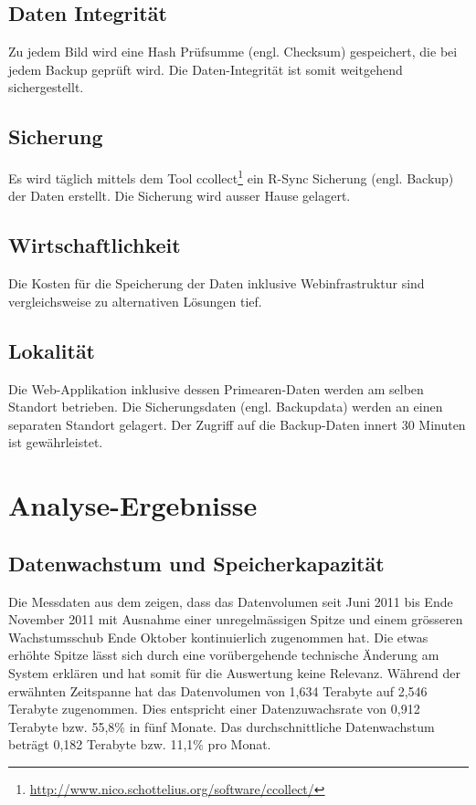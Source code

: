 \subsection{Daten Integrität}
Zu jedem Bild wird eine Hash Prüfsumme (engl. Checksum) gespeichert, die bei jedem Backup geprüft wird. Die Daten-Integrität ist somit weitgehend sichergestellt.

\subsection{Sicherung}
Es wird täglich mittels dem Tool ccollect\footnote{\url{http://www.nico.schottelius.org/software/ccollect/}} ein R-Sync Sicherung (engl. Backup) der Daten erstellt. Die Sicherung wird ausser Hause gelagert.

\subsection{Wirtschaftlichkeit}
Die Kosten für die Speicherung der Daten inklusive Webinfrastruktur sind vergleichsweise zu alternativen Lösungen tief.

\subsection{Lokalität}

Die Web-Applikation inklusive dessen \gls{Primearen-Daten} werden am selben Standort betrieben. Die Sicherungsdaten (engl. Backupdata) werden an einen separaten Standort gelagert. Der Zugriff auf die Backup-Daten innert 30 Minuten ist gewährleistet.

\section{Analyse-Ergebnisse}

\subsection{Datenwachstum und Speicherkapazität}
Die Messdaten aus dem  zeigen, dass das Datenvolumen seit Juni 2011 bis Ende November 2011 mit Ausnahme einer unregelmässigen Spitze und einem grösseren Wachstumsschub Ende Oktober kontinuierlich zugenommen hat. Die etwas erhöhte Spitze lässt sich durch eine vorübergehende technische Änderung am System erklären und hat somit für die Auswertung keine Relevanz. Während der erwähnten Zeitspanne hat das Datenvolumen von 1,634 Terabyte auf 2,546 Terabyte zugenommen. Dies entspricht einer Datenzuwachsrate von 0,912 Terabyte bzw. 55,8\% in fünf Monate. Das durchschnittliche Datenwachstum beträgt 0,182 Terabyte bzw. 11,1\% pro Monat.

